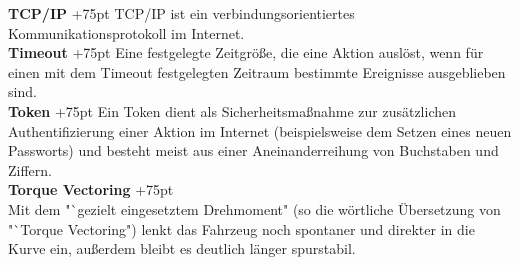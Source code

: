 \documentclass[fontsize = 12pt, paper = a4]{scrreprt}
\begin{document}
\textbf{TCP/IP}
\hangindent+75pt 
\hspace*{6mm}
TCP/IP ist ein verbindungsorientiertes Kommunikationsprotokoll im Internet.\\

\textbf{Timeout}
\hangindent+75pt 
\hspace*{6mm}
Eine festgelegte Zeitgröße, die eine Aktion auslöst, wenn für einen mit dem Timeout festgelegten Zeitraum bestimmte Ereignisse ausgeblieben sind.\\

\textbf{Token}
\hangindent+75pt  
\hspace*{12mm}
Ein Token dient als Sicherheitsmaßnahme zur zusätzlichen Authentifizierung einer Aktion im Internet (beispielsweise dem Setzen eines neuen Passworts) und besteht meist aus einer Aneinanderreihung von Buchstaben und Ziffern.\\

\textbf{Torque Vectoring}
\hangindent+75pt  \\
Mit dem "`gezielt eingesetztem Drehmoment" (so die wörtliche Übersetzung von "`Torque Vectoring") lenkt das Fahrzeug noch spontaner und direkter in die Kurve ein, außerdem bleibt es deutlich länger spurstabil.\\
\end{document}
